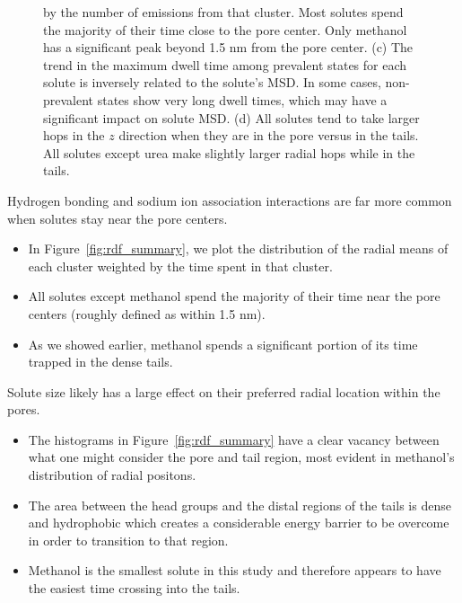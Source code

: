 \documentclass{article}
\begin{document}
\begin{figure}
{  by the number of emissions from that cluster. Most solutes spend the majority of
  their time close to the pore center. Only methanol has a significant peak
  beyond 1.5 nm from the pore center. (c) The trend in the maximum dwell time
  among prevalent states for each solute is inversely related to the
  solute's MSD. In some cases, non-prevalent states show very long dwell times,
  which may have a significant impact on solute MSD. (d) All solutes tend to
  take larger hops in the $z$ direction when they are in the pore versus in 
  the tails. All solutes except urea make slightly larger radial hops while 
  in the tails.
  }\label{fig:summaries}
  \end{figure}
  
  Hydrogen bonding and sodium ion association interactions are far more 
  common when solutes stay near the pore centers.
  \begin{itemize}
    \item In Figure~\ref{fig:rdf_summary}, we plot the distribution of the 
    radial means of each cluster weighted by the time spent in that cluster.
    \item All solutes except methanol spend the majority of their time near
    the pore centers (roughly defined as within 1.5 nm).
    \item As we showed earlier, methanol spends a significant portion of its
    time trapped in the dense tails.
  \end{itemize}
  
  Solute size likely has a large effect on their preferred radial location within
  the pores.
  \begin{itemize}
    \item The histograms in Figure~\ref{fig:rdf_summary} have a clear vacancy between
    what one might consider the pore and tail region, most evident in methanol's 
    distribution of radial positons.
    \item The area between the head groups and the distal regions of the tails is
    dense and hydrophobic which creates a considerable energy barrier to be overcome
    in order to transition to that region.
    \item Methanol is the smallest solute in this study and therefore appears to 
    have the easiest time crossing into the tails. 
  \end{itemize}
\end{document}
